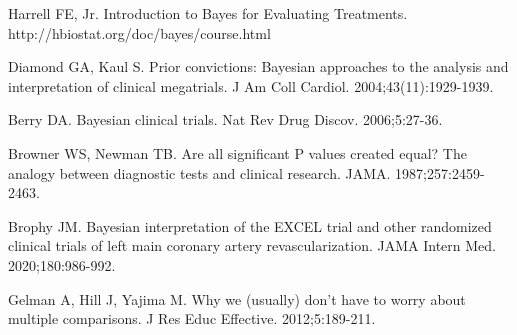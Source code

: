 \begin{references}
\item Harrell FE, Jr. Introduction to Bayes for Evaluating Treatments. http://hbiostat.org/doc/bayes/course.html
\item Diamond GA, Kaul S. Prior convictions: Bayesian approaches to the analysis and interpretation of clinical megatrials. J Am Coll Cardiol. 2004;43(11):1929-1939.
\item Berry DA. Bayesian clinical trials. Nat Rev Drug Discov. 2006;5:27-36.
\item Browner WS, Newman TB. Are all significant P values created equal? The analogy between diagnostic tests and clinical research. JAMA. 1987;257:2459-2463.
\item Brophy JM. Bayesian interpretation of the EXCEL trial and other randomized clinical trials of left main coronary artery revascularization. JAMA Intern Med. 2020;180:986-992.
\item Gelman A, Hill J, Yajima M. Why we (usually) don’t have to worry about multiple comparisons. J Res Educ Effective. 2012;5:189-211.
\end{references}
